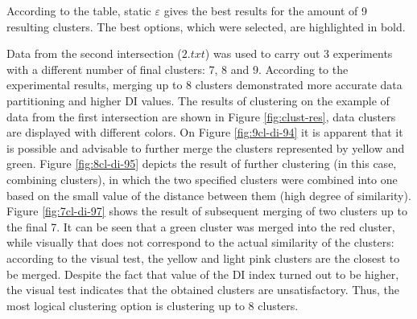 According to the table, static $\varepsilon$ gives the best results for the amount of 9 resulting clusters. The best options, which were selected, are highlighted in bold.

Data from the second intersection ($2.txt$) was used to carry out 3 experiments with a different number of final clusters: 7, 8 and 9. According to the experimental results, merging up to 8 clusters demonstrated more accurate data partitioning and higher DI values. The results of clustering on the example of data from the first intersection are shown in Figure \ref{fig:clust-res}, data clusters are displayed with different colors. On Figure \ref{fig:9cl-di-94} it is apparent that it is possible and advisable to further merge the clusters represented by yellow and green. Figure \ref{fig:8cl-di-95} depicts the result of further clustering (in this case, combining clusters), in which the two specified clusters were combined into one based on the small value of the distance between them (high degree of similarity). Figure \ref{fig:7cl-di-97} shows the result of subsequent merging of two clusters up to the final 7. It can be seen that a green cluster was merged into the red cluster, while visually that does not correspond to the actual similarity of the clusters: according to the visual test, the yellow and light pink clusters are the closest to be merged. Despite the fact that value of the DI index turned out to be higher, the visual test indicates that the obtained clusters are unsatisfactory. Thus, the most logical clustering option is clustering up to 8 clusters.


